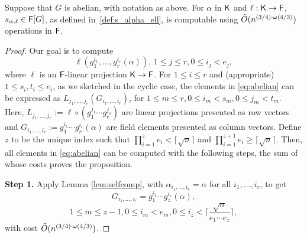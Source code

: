 \begin{proposition}\label{prop:abelian}
  Suppose that $G$ is abelian, with notation as above. For $\alpha$ in
  ${\mathsf{K}}$ and $\ell:{\mathsf{K}}\to{\mathsf{F}}$, $s_{\alpha,\ell} \in {\mathsf{F}}[G]$, as defined
  in~\eqref{def:s_alpha_ell}, is computable using $\tilde{O}(n^{(3/4)\cdot \omega(4/3)})$
  operations in ${\mathsf{F}}$.
\end{proposition}
\begin{proof}
Our goal is to compute
\begin{equation}\label{eq:abelian}
  \ell (g_1^{i_1},  \ldots, g_r^{i_r}(\alpha)), \, 1 \leq j \leq r, 0 \leq i_j < e_j,
\end{equation}
where $\ell$ is an ${\mathsf{F}}$-linear projection ${\mathsf{K}}\to {\mathsf{F}}$.  For $ 1\leq i
\leq r$ and (appropriate) $1 \leq s_i, t_i \leq e_i$, as we sketched in the
cyclic case, the elements in \eqref{eq:abelian} can be expressed as
$L_{j_1,\dots, j_r} (G_{i_1,\dots,i_r})$, 
for $1\leq m \leq r, 0\leq i_m < s_m, 0 \leq j_m < t_m$.
Here, $L_{j_1,\dots,j_r} :=\ell \circ (g_1^{j_1} \cdots
g_r^{j_s})$ are linear projections presented as row vectors and
$G_{i_1,\dots,i_r}:=g_1^{i_1} \cdots g_r^{i_r}(\alpha)$ are field
elements presented as column vectors. Define $z$ to be the unique index such that 
$\prod_{i = 1}^{z} e_i < \lceil \sqrt{n} \rceil$ and 
$\prod_{i = 1}^{z+1} e_i \geq \lceil \sqrt{n} \rceil.$ 
Then, all elements in
\eqref{eq:abelian} can be computed with the following steps, the sum of whose 
costs proves the proposition.

\smallskip\noindent \textbf{Step 1.} Apply Lemma \ref{lem:selfcomp},
with $\alpha_{i_1,\dots,i_r} = \alpha$ for all $i_1,\dots,i_r$, to get
$$
G_{i_1,\dots,i_r}=g_1^{i_1} \cdots g_z^{i_z}(\alpha),$$
$$
 1\leq m \leq z-1, 0\leq i_m < e_m,
0\leq i_z < \Big\lceil \frac{\sqrt{n}}{e_1 \cdots e_z} \Big\rceil,
$$
with cost $\tilde{O}(n^{(3/4)\cdot \omega(4/3)})$.


\end{proof}
